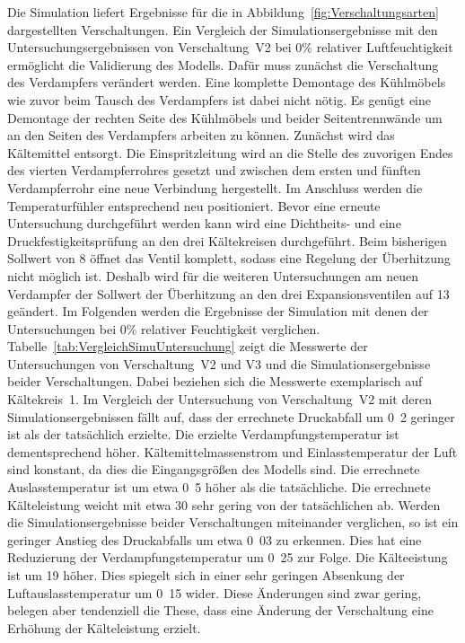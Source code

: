 Die Simulation liefert Ergebnisse für die in Abbildung~\ref{fig:Verschaltungsarten} dargestellten Verschaltungen. Ein Vergleich der Simulationsergebnisse mit den Untersuchungsergebnissen von Verschaltung~V2 bei \unit{0}{\%} relativer Luftfeuchtigkeit ermöglicht die Validierung des Modells. Dafür muss zunächst die Verschaltung des Verdampfers verändert werden. Eine komplette Demontage des Kühlmöbels wie zuvor beim Tausch des Verdampfers ist dabei nicht nötig. Es genügt eine Demontage der rechten Seite des Kühlmöbels und beider Seitentrennwände um an den Seiten des Verdampfers arbeiten zu können. Zunächst wird das Kältemittel entsorgt. Die Einspritzleitung wird an die Stelle des zuvorigen Endes des vierten Verdampferrohres gesetzt und zwischen dem ersten und fünften Verdampferrohr eine neue Verbindung hergestellt. Im Anschluss werden die Temperaturfühler entsprechend neu positioniert. Bevor eine erneute Untersuchung durchgeführt werden kann wird eine Dichtheits- und eine Druckfestigkeitsprüfung an den drei Kältekreisen durchgeführt. Beim bisherigen Sollwert von \unit{8}{\kelvin} öffnet das Ventil komplett, sodass eine Regelung der Überhitzung nicht möglich ist. Deshalb wird für die weiteren Untersuchungen am neuen Verdampfer der Sollwert der Überhitzung an den drei Expansionsventilen auf \unit{13}{\kelvin} geändert. \newline 
Im Folgenden werden die Ergebnisse der Simulation mit denen der Untersuchungen bei \unit{0}{\%} relativer Feuchtigkeit verglichen. Tabelle~\ref{tab:VergleichSimuUntersuchung} zeigt die Messwerte der Untersuchungen von Verschaltung~V2 und V3 und die Simulationsergebnisse beider Verschaltungen. Dabei beziehen sich die Messwerte exemplarisch auf Kältekreis~1. 
Im Vergleich der Untersuchung von Verschaltung~V2 mit deren Simulationsergebnissen fällt auf, dass der errechnete Druckabfall um \unit{0.2}{\bbar} geringer ist als der tatsächlich erzielte. Die erzielte Verdampfungstemperatur ist dementsprechend höher.
Kältemittelmassenstrom und Einlasstemperatur der Luft sind konstant, da dies die Eingangsgrößen des Modells sind. Die errechnete Auslasstemperatur ist um etwa \unit{0.5}{\kelvin} höher als die tatsächliche. Die errechnete Kälteleistung weicht mit etwa \unit{30}{\watt} sehr gering von der tatsächlichen ab.  \newline Werden die Simulationsergebnisse beider Verschaltungen miteinander verglichen, so ist ein geringer Anstieg des Druckabfalls um etwa \unit{0.03}{\bbar} zu erkennen. Dies hat eine Reduzierung der Verdampfungstemperatur um \unit{0.25}{\kelvin} zur Folge. Die Kälteeistung ist um \unit{19}{\watt} höher. Dies spiegelt sich in einer sehr geringen Absenkung der Luftauslasstemperatur um \unit{0.15}{\kelvin} wider. Diese Änderungen sind zwar gering, belegen aber tendenziell die These, dass eine Änderung der Verschaltung eine Erhöhung der Kälteleistung erzielt. \newline
